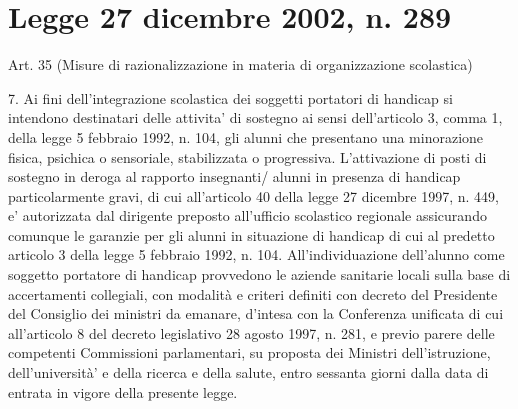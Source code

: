 \chapter{Legge 27 dicembre 2002, n. 289}
\label{cha:Legge_27_dicembre_2002_289}

Art. 35
(Misure di razionalizzazione in materia di organizzazione scolastica)

7. Ai fini dell'integrazione scolastica dei soggetti portatori di handicap si intendono destinatari delle attivita' di sostegno ai sensi dell'articolo 3, comma 1, della legge 5 febbraio 1992, n. 104, gli alunni che presentano una minorazione fisica, psichica o sensoriale, stabilizzata o progressiva. L'attivazione di posti di sostegno in deroga al rapporto insegnanti/ alunni in presenza di handicap particolarmente gravi, di cui all'articolo 40 della legge 27 dicembre 1997, n. 449, e' autorizzata dal dirigente preposto all'ufficio scolastico regionale assicurando comunque le garanzie per gli alunni in situazione di handicap di cui al predetto articolo 3 della legge 5 febbraio 1992, n. 104. All'individuazione dell'alunno come soggetto portatore di handicap provvedono le aziende sanitarie locali sulla base di accertamenti collegiali, con modalità e criteri definiti con decreto del Presidente del Consiglio dei ministri da emanare, d'intesa con la Conferenza unificata di cui all'articolo 8 del decreto legislativo 28 agosto 1997, n. 281, e previo parere delle competenti Commissioni parlamentari, su proposta dei Ministri dell'istruzione, dell'università' e della ricerca e della salute, entro sessanta giorni dalla data di entrata in vigore della presente legge.